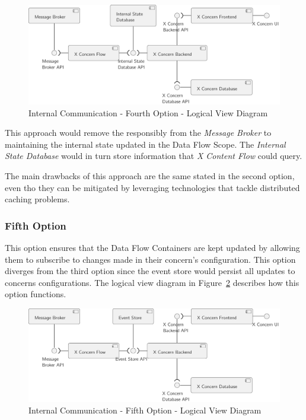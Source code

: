 \begin{figure}[H]
   \centering
   \includegraphics[page=1,width=0.8\columnwidth]{assets/diagrams/design/alternatives/internal/alternative4.pdf}
   \caption[Internal Communication - Fourth Option - Logical View Diagram]{Internal Communication - Fourth Option - Logical View Diagram}
   \label{fig:design:alternatives:internal:fourth:diagram}
\end{figure}

This approach would remove the responsibly from the \textit{Message Broker} to maintaining the internal state updated in the Data Flow Scope.
The \textit{Internal State Database} would in turn store information that \textit{X Content Flow} could query.

The main drawbacks of this approach are the same stated in the second option, even tho they can be mitigated by leveraging technologies that tackle distributed caching problems.

\subsubsection{Fifth Option}
\label{subsubsec:design:alternatives:internal:fifth}

This option ensures that the Data Flow Containers are kept updated by allowing them to subscribe to changes made in their concern's configuration. This option diverges from the third option since the event store would persist all updates to concerns configurations. The logical view diagram in Figure~\ref{fig:design:alternatives:internal:fifth:diagram} describes how this option functions.

\begin{figure}[H]
   \centering
   \includegraphics[page=1,width=0.8\columnwidth]{assets/diagrams/design/alternatives/internal/alternative5.pdf}
   \caption[Internal Communication - Fifth Option - Logical View Diagram]{Internal Communication - Fifth Option - Logical View Diagram}
   \label{fig:design:alternatives:internal:fifth:diagram}
\end{figure}

